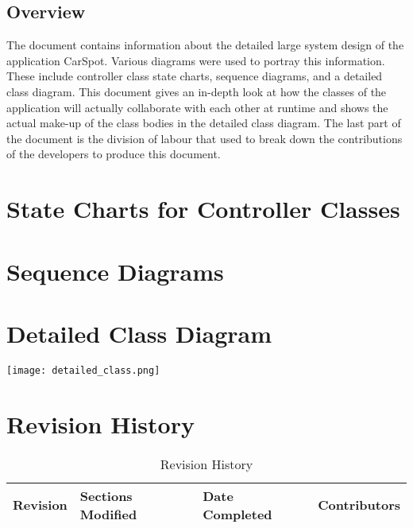 \documentclass[12pt]{article}
\begin{document}
\subsection{Overview}
\label{sub:overview}
The document contains information about the detailed large system design of the application CarSpot. Various diagrams were used to portray this information. These include controller class state charts, sequence diagrams, and a detailed class diagram. This document gives an in-depth look at how the classes of the application will actually collaborate with each other at runtime and shows the actual make-up of the class bodies in the detailed class diagram. The last part of the document is the division of labour that used to break down the contributions of the developers to produce this document.


\section{State Charts for Controller Classes}

\section{Sequence Diagrams}

\section{Detailed Class Diagram}
\texttt{[image: detailed\_class.png]}

\newpage

\FloatBarrier
\appendix
\section{Revision History}
\begin{table}[ht]
	\centering
	\begin{tabular}{|p{2cm}|p{5cm}|p{3cm}|p{3cm}|}
		\hline
		\textbf{Revision} & \textbf{Sections Modified} & \textbf{Date Completed} & \textbf{Contributors}\\
		\hline
	\end{tabular}
	\caption{Revision History}
	\label{table:1}
\end{table}
\end{document}
